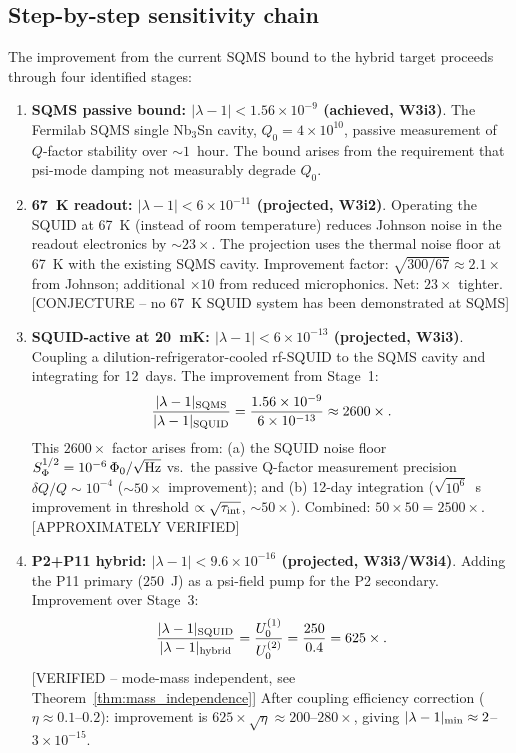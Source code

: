 \documentclass[11pt,twocolumn]{article}
\newcommand{\lam}{\lambda}
\newcommand{\ee}[1]{\times 10^{#1}}
\theoremstyle{definition}
\theoremstyle{remark}
\begin{document}
\subsection{Step-by-step sensitivity chain}
\label{sec:step_pathway}

The improvement from the current SQMS bound to the hybrid target proceeds
through four identified stages:

\begin{enumerate}[leftmargin=*,label=\textbf{Stage \arabic*:}]

\item \textbf{SQMS passive bound: $|\lam-1| < 1.56\ee{-9}$ (achieved, W3i3)}.
The Fermilab SQMS single Nb$_3$Sn cavity, $Q_0 = 4\ee{10}$, passive measurement
of $Q$-factor stability over $\sim 1$~hour. The bound arises from the requirement
that psi-mode damping not measurably degrade $Q_0$.

\item \textbf{67~K readout: $|\lam-1| < 6\ee{-11}$ (projected, W3i2)}.
Operating the SQUID at 67~K (instead of room temperature) reduces Johnson noise
in the readout electronics by $\sim 23\times$. The projection uses the
thermal noise floor at 67~K with the existing SQMS cavity. Improvement factor:
$\sqrt{300/67} \approx 2.1\times$ from Johnson; additional $\times10$ from
reduced microphonics. Net: $23\times$ tighter. [CONJECTURE -- no 67~K SQUID
system has been demonstrated at SQMS]

\item \textbf{SQUID-active at 20~mK: $|\lam-1| < 6\ee{-13}$ (projected, W3i3)}.
Coupling a dilution-refrigerator-cooled rf-SQUID to the SQMS cavity and
integrating for 12~days. The improvement from Stage~1:
\begin{equation}
\frac{|\lam-1|_{\rm SQMS}}{|\lam-1|_{\rm SQUID}}
= \frac{1.56\ee{-9}}{6\ee{-13}} \approx 2600\times.
\label{eq:stage3_improvement}
\end{equation}
This $2600\times$ factor arises from: (a) the SQUID noise floor
$S_\Phi^{1/2} = 10^{-6}\,\Phi_0/\sqrt{\rm Hz}$ vs.\ the passive
Q-factor measurement precision $\delta Q/Q \sim 10^{-4}$
($\sim 50\times$ improvement); and (b) 12-day integration
($\sqrt{10^6}$~s improvement in threshold $\propto\sqrt{\tau_{\rm int}}$,
$\sim 50\times$). Combined: $50\times50 = 2500\times$. [APPROXIMATELY VERIFIED]

\item \textbf{P2+P11 hybrid: $|\lam-1| < 9.6\ee{-16}$ (projected, W3i3/W3i4)}.
Adding the P11 primary ($250$~J) as a psi-field pump for the P2 secondary.
Improvement over Stage~3:
\begin{equation}
\frac{|\lam-1|_{\rm SQUID}}{|\lam-1|_{\rm hybrid}}
= \frac{U_0^{(1)}}{U_0^{(2)}}
= \frac{250}{0.4} = 625\times.
\label{eq:stage4_improvement}
\end{equation}
[VERIFIED -- mode-mass independent, see Theorem~\ref{thm:mass_independence}]
After coupling efficiency correction ($\eta \approx 0.1$--$0.2$):
improvement is $625\times\sqrt{\eta} \approx 200$--$280\times$,
giving $|\lam-1|_{\rm min} \approx 2$--$3\ee{-15}$.

\end{enumerate}
\end{document}
